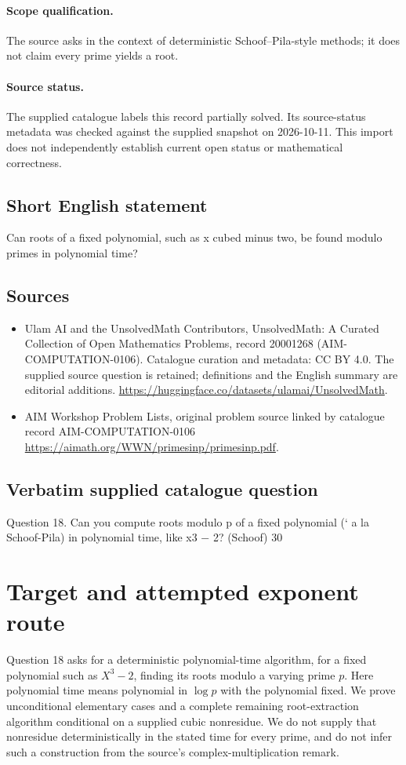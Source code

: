 \documentclass[11pt]{article}
\begin{document}
\paragraph{Scope qualification.}
The source asks in the context of deterministic Schoof--Pila-style methods; it does not claim every prime yields a root.
\paragraph{Source status.}
The supplied catalogue labels this record partially solved. Its source-status metadata was checked against the supplied snapshot on 2026-10-11. This import does not independently establish current open status or mathematical correctness.
\subsection{Short English statement}
Can roots of a fixed polynomial, such as x cubed minus two, be found modulo primes in polynomial time?
\subsection{Sources}
\begin{itemize}
\item[S1] Ulam AI and the UnsolvedMath Contributors, UnsolvedMath: A Curated Collection of Open Mathematics Problems, record 20001268 (AIM-COMPUTATION-0106). Catalogue curation and metadata: CC BY 4.0. The supplied source question is retained; definitions and the English summary are editorial additions.
\url{https://huggingface.co/datasets/ulamai/UnsolvedMath}.
\item[S2] AIM Workshop Problem Lists, original problem source linked by catalogue record AIM-COMPUTATION-0106
\url{https://aimath.org/WWN/primesinp/primesinp.pdf}.
\end{itemize}
\subsection{Verbatim supplied catalogue question}
Question 18. Can you compute roots modulo p of a fixed polynomial (` a la Schoof-Pila) in polynomial time, like x3 − 2? (Schoof) 30

\section{Target and attempted exponent route}
Question 18 asks for a deterministic polynomial-time algorithm, for a
fixed polynomial such as $X^3-2$, finding its roots modulo a varying
prime $p$. Here polynomial time means polynomial in $\log p$ with
the polynomial fixed. We prove unconditional elementary cases and a
complete remaining root-extraction algorithm conditional on a supplied
cubic nonresidue. We do not supply that nonresidue deterministically
in the stated time for every prime, and do not infer such a construction
from the source's complex-multiplication remark.
\end{document}
